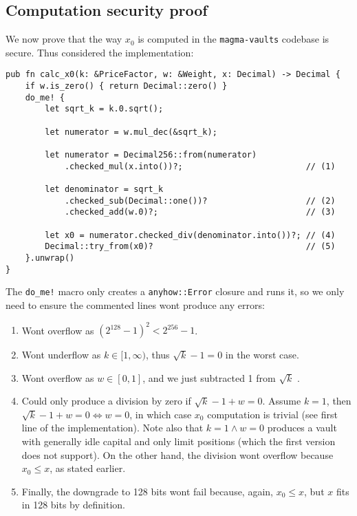 \documentclass[11pt]{article}
\begin{document}
\subsection{Computation security proof}
We now prove that the way $x_0$ is computed in the \texttt{magma-vaults} codebase
is secure. Thus considered the implementation:
\begin{verbatim}
pub fn calc_x0(k: &PriceFactor, w: &Weight, x: Decimal) -> Decimal {
    if w.is_zero() { return Decimal::zero() }
    do_me! {
        let sqrt_k = k.0.sqrt();

        let numerator = w.mul_dec(&sqrt_k);

        let numerator = Decimal256::from(numerator)
            .checked_mul(x.into())?;                         // (1)

        let denominator = sqrt_k
            .checked_sub(Decimal::one())?                    // (2)
            .checked_add(w.0)?;                              // (3)

        let x0 = numerator.checked_div(denominator.into())?; // (4)
        Decimal::try_from(x0)?                               // (5)
    }.unwrap()
}
\end{verbatim}
The \texttt{do\_me!} macro only creates a \texttt{anyhow::Error} closure
and runs it, so we only need to ensure the commented lines wont produce
any errors:
\begin{enumerate}[label=(\arabic*).]
    \item Wont overflow as $(2^{128} - 1)^2 < 2^{256} - 1$.
    \item Wont underflow as $k\in[1, \infty)$, thus $\sqrt k - 1 = 0$ in the
        worst case.
    \item Wont overflow as $w\in[0, 1]$, and we just subtracted 1 from $\sqrt
        k$ .
    \item Could only produce a division by zero if $\sqrt k -  1 + w = 0$.
        Assume $k= 1$, then $\sqrt k - 1 + w = 0 \iff w = 0$, in which case
        $x_0$ computation is trivial (see first line of the implementation).
        Note also that $k = 1 \land w = 0$ produces a vault with generally idle
        capital and only limit positions (which the first version does not
        support). On the other hand, the division wont overflow because $x_0
        \leq x$, as stated earlier.
    \item Finally, the downgrade to 128 bits wont fail because, again, $x_0
        \leq x$, but $x$ fits in 128 bits by definition.
\end{enumerate}
\end{document}
